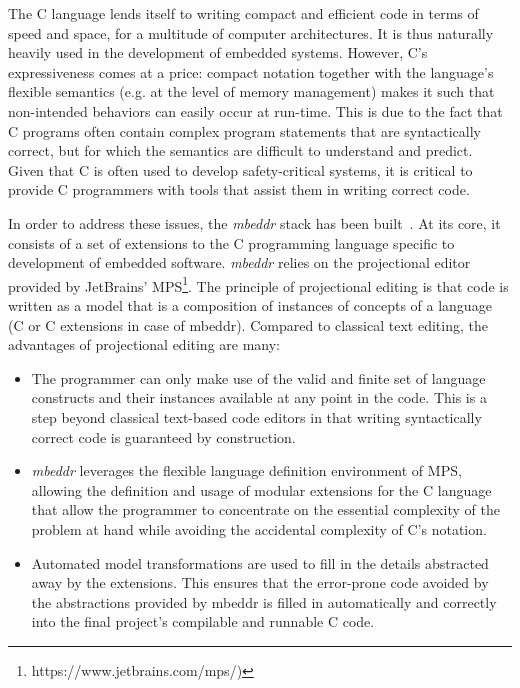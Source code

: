 The C language lends itself to writing compact and efficient code in terms of
speed and space, for a multitude of computer architectures. It is thus naturally
heavily used in the development of embedded systems. However, C's expressiveness
comes at a price: compact notation together with the language's flexible
semantics (e.g. at the level of memory management) makes it such that
non-intended behaviors can easily occur at run-time. This is due to the fact
that C programs often contain complex program statements that are syntactically
correct, but for which the semantics are difficult to understand and predict. Given that C is
often used to develop safety-critical systems, it is critical to provide
C programmers with tools that assist them in writing correct code.

In order to address these issues, the \emph{mbeddr} stack 
has been built~\cite{VoelterRKS13}. At its core, it consists of a set of
extensions to the C programming language specific to development of embedded
software. \emph{mbeddr} relies on the projectional editor provided
by JetBrains’ MPS\footnote{https://www.jetbrains.com/mps/)}.
The principle of projectional editing is that code is written as a model that is
a composition of instances of concepts of a language (C or C extensions in case
of mbeddr). Compared to classical text editing, the advantages of projectional
editing are many:

\begin{itemize}
  \item The programmer can only make use of the valid and finite set of language
  constructs and their instances available at any point in the code. This is a
  step beyond classical text-based code editors in that writing syntactically
  correct code is guaranteed by construction.
  \item \emph{mbeddr} leverages the flexible language definition environment of MPS,
  allowing the definition and usage of modular extensions for the C language
  that allow the programmer to concentrate on the essential complexity of the problem
  at hand while avoiding the accidental complexity of C’s notation.
  \item Automated model transformations are used to fill in the
  details abstracted away by the extensions. This ensures that the error-prone
  code avoided by the abstractions provided by mbeddr is filled in automatically
  and correctly into the final project’s compilable and runnable C code.
\end{itemize}
